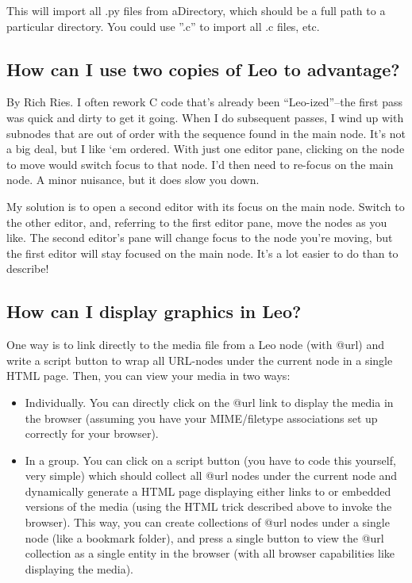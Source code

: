\documentclass[a4paper,10pt,english]{sphinxmanual}
\begin{document}
This will import all .py files from aDirectory, which should be a full path to a particular directory.
You could use ''.c'' to import all .c files, etc.


\subsection{How can I use two copies of Leo to advantage?}
\label{FAQ:how-can-i-use-two-copies-of-leo-to-advantage}
By Rich Ries.
I often rework C code that's already been ``Leo-ized''--the first pass was quick
and dirty to get it going. When I do subsequent passes, I wind up with subnodes
that are out of order with the sequence found in the main node. It's not a big
deal, but I like `em ordered. With just one editor pane, clicking on the node to
move would switch focus to that node. I'd then need to re-focus on the main
node. A minor nuisance, but it does slow you down.

My solution is to open a second editor with its focus on the main node. Switch
to the other editor, and, referring to the first editor pane, move the nodes as
you like. The second editor's pane will change focus to the node you're moving,
but the first editor will stay focused on the main node. It's a lot easier to
do than to describe!


\subsection{How can I display graphics in Leo?}
\label{FAQ:how-can-i-display-graphics-in-leo}
One way is to link directly to the media file from a Leo node (with @url) and
write a script button to wrap all URL-nodes under the current node in a single
HTML page. Then, you can view your media in two ways:
\begin{itemize}
\item {} 
Individually. You can directly click on the @url link to display the media
in the browser (assuming you have your MIME/filetype associations set up
correctly for your browser).

\item {} 
In a group. You can click on a script button (you have to code this yourself,
very simple) which should collect all @url nodes under the current node
and dynamically generate a HTML page displaying either links to or embedded
versions of the media (using the HTML trick described above to invoke the
browser). This way, you can create collections of @url nodes under a
single node (like a bookmark folder), and press a single button to view the
@url collection as a single entity in the browser (with all browser
capabilities like displaying the media).

\end{itemize}
\end{document}
